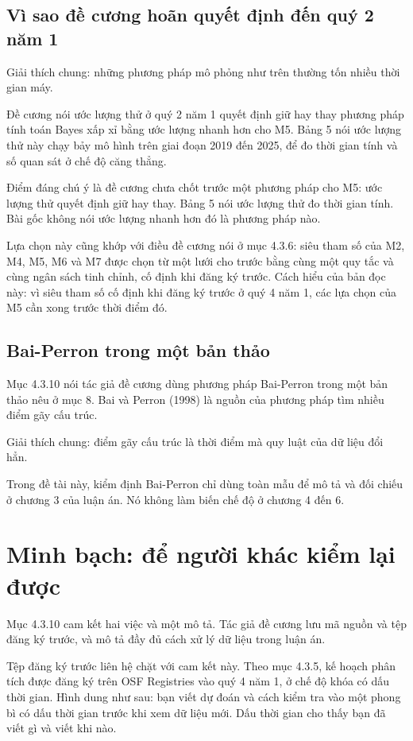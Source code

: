 \subsection{Vì sao đề cương hoãn quyết định đến quý 2 năm 1}

Giải thích chung: những phương pháp mô phỏng như trên thường tốn nhiều thời gian máy.

Đề cương nói ước lượng thử ở quý 2 năm 1 quyết định giữ hay thay phương pháp tính toán Bayes xấp xỉ bằng ước lượng nhanh hơn cho M5. Bảng 5 nói ước lượng thử này chạy bảy mô hình trên giai đoạn 2019 đến 2025, để đo thời gian tính và số quan sát ở chế độ căng thẳng.

Điểm đáng chú ý là đề cương chưa chốt trước một phương pháp cho M5: ước lượng thử quyết định giữ hay thay. Bảng 5 nói ước lượng thử đo thời gian tính. Bài gốc không nói ước lượng nhanh hơn đó là phương pháp nào.

Lựa chọn này cũng khớp với điều đề cương nói ở mục 4.3.6: siêu tham số của M2, M4, M5, M6 và M7 được chọn từ một lưới cho trước bằng cùng một quy tắc và cùng ngân sách tinh chỉnh, cố định khi đăng ký trước. Cách hiểu của bản đọc này: vì siêu tham số cố định khi đăng ký trước ở quý 4 năm 1, các lựa chọn của M5 cần xong trước thời điểm đó.

\subsection{Bai-Perron trong một bản thảo}

Mục 4.3.10 nói tác giả đề cương dùng phương pháp Bai-Perron trong một bản thảo nêu ở mục 8. Bai và Perron (1998) là nguồn của phương pháp tìm nhiều điểm gãy cấu trúc.

Giải thích chung: điểm gãy cấu trúc là thời điểm mà quy luật của dữ liệu đổi hẳn.

Trong đề tài này, kiểm định Bai-Perron chỉ dùng toàn mẫu để mô tả và đối chiếu ở chương 3 của luận án. Nó không làm biến chế độ ở chương 4 đến 6.

\section{Minh bạch: để người khác kiểm lại được}

Mục 4.3.10 cam kết hai việc và một mô tả. Tác giả đề cương lưu mã nguồn và tệp đăng ký trước, và mô tả đầy đủ cách xử lý dữ liệu trong luận án.

Tệp đăng ký trước liên hệ chặt với cam kết này. Theo mục 4.3.5, kế hoạch phân tích được đăng ký trên OSF Registries vào quý 4 năm 1, ở chế độ khóa có dấu thời gian. Hình dung như sau: bạn viết dự đoán và cách kiểm tra vào một phong bì có dấu thời gian trước khi xem dữ liệu mới. Dấu thời gian cho thấy bạn đã viết gì và viết khi nào.

